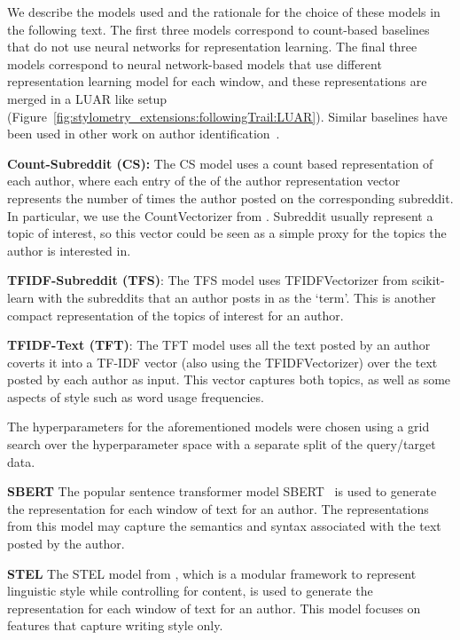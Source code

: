 We describe the models used and the rationale for the choice of these models in the following text.
The first three models correspond to count-based baselines that do not use neural networks for representation learning.
The final three models correspond to neural network-based models that use different representation learning model for each window, and these representations are merged in a LUAR like setup (Figure~\ref{fig:stylometry_extensions:followingTrail:LUAR}).
Similar baselines have been used in other work on author identification~\cite{wang2023can,soto2024fewshot}.

\noindent \textbf{Count-Subreddit (CS):}
The CS model uses a count based representation of each author, where each entry of the of the author representation vector represents the number of times the author posted on the corresponding subreddit.
In particular, we use the CountVectorizer from \citet{scikit-learn}. %
Subreddit usually represent a topic of interest, so this vector could be seen as a simple proxy for the topics the author is interested in.

\noindent \textbf{TFIDF-Subreddit (TFS)}:
The TFS model uses TFIDFVectorizer from scikit-learn with the subreddits that an author posts in as the `term'.
This is another compact representation of the topics of interest for an author.

\noindent \textbf{TFIDF-Text (TFT)}:
The TFT model uses all the text posted by an author coverts it into a TF-IDF vector (also using the TFIDFVectorizer) over the text posted by each author as input.
This vector captures both topics, as well as some aspects of style such as word usage frequencies.

The hyperparameters for the aforementioned models were chosen using a grid search over the hyperparameter space with a separate split of the query/target data.

\noindent \textbf{SBERT} The popular sentence transformer model SBERT~\cite{reimers2019sentencebert} is used to generate the representation for each window of text for an author.
The representations from this model may capture the semantics and syntax associated with the text posted by the author.


\noindent \textbf{STEL} The STEL model from \citet{wegmann2021capture}, which is a modular framework to represent linguistic style while controlling for content, is used to generate the representation for each window of text for an author.
This model focuses on features that capture writing style only.

